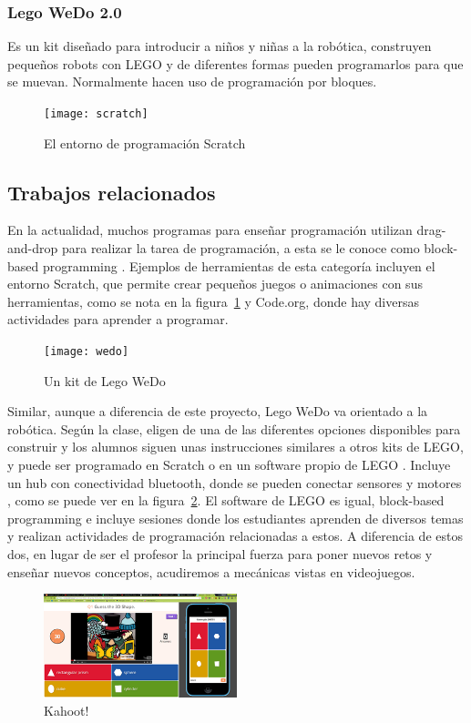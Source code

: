 \subsubsection{Lego WeDo 2.0}
Es un kit diseñado para introducir a niños y niñas a la robótica, 
construyen pequeños robots con LEGO y de diferentes 
formas pueden programarlos para que se muevan. 
Normalmente hacen uso de programación por bloques.

\begin{figure}[ht]
    \centering
    \texttt{[image: scratch]}
    \caption{El entorno de programación Scratch}
    \label{fig:scratch_scrn}
\end{figure}

\subsection{Trabajos relacionados}
En la actualidad, muchos programas para enseñar programación utilizan 
drag-and-drop para realizar la tarea de programación, 
a esta se le conoce como block-based programming \cite{block_based_programming}. 
Ejemplos de herramientas de esta categoría incluyen el entorno Scratch, 
que permite crear pequeños juegos o animaciones con sus herramientas, 
como se nota en la figura~\ref{fig:scratch_scrn} y Code.org, donde hay diversas actividades 
para aprender a programar.

\begin{figure}[ht]
    \centering
    \texttt{[image: wedo]}
    \caption{Un kit de Lego WeDo}
    \label{fig:wedo_kit}
\end{figure}

Similar, aunque a diferencia de este proyecto, Lego WeDo va orientado a la robótica. Según la clase, eligen de una de las diferentes opciones disponibles para construir y los alumnos siguen unas instrucciones similares a otros kits de LEGO, y puede ser programado en Scratch o en un software propio de LEGO \cite{lego_wedo_explanation}. Incluye un hub con conectividad bluetooth, donde se pueden conectar sensores y motores \cite{lego_wedo_site}, como se puede ver en la figura~\ref{fig:wedo_kit}. El software de LEGO es igual, block-based programming e incluye sesiones donde los estudiantes aprenden de diversos temas y realizan actividades de programación relacionadas a estos. A diferencia de estos dos, en lugar de ser el profesor la principal fuerza para poner nuevos retos y enseñar nuevos conceptos, acudiremos a mecánicas vistas en videojuegos.

\begin{figure}[ht]
    \centering
    \includegraphics[width=0.5\textwidth]{images/kahoot.png}
    \caption{Kahoot!}
    \label{fig:kahoot}
\end{figure}

